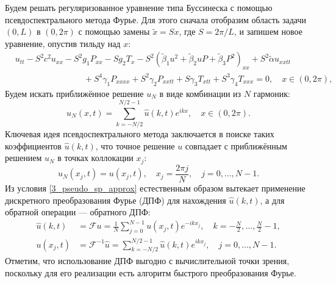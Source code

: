 \documentclass[12pt, a4paper]{report}
\begin{document}
Будем решать регуляризованное уравнение типа Буссинеска с помощью псевдоспектрального метода Фурье. Для этого сначала отобразим область задачи $(0, L)$ в $(0, 2\pi)$ с помощью замены $\tilde x = Sx$, где $S = 2\pi/L$, и запишем новое уравнение, опустив тильду над $x$:
\begin{equation}
\label{3_bq_reg_scaled}
\begin{split}
&u_{tt} - S^2 c^2 u_{xx} - S^2 g_1 P_{xx} - S g_2 T_x - S^2\left(\tilde{\beta}_1 u^2 + \tilde{\beta}_2 u P + \tilde{\beta}_3 P^2\right)_{xx} + S^2\tilde\alpha u_{xxtt}\\
&\qquad\qquad\qquad\qquad + S^4\gamma_1 P_{xxxx} + S^2\gamma_2 P_{xxtt} + S\gamma_3 T_{xtt} + S^3\gamma_4 T_{xxx} = 0, \quad x\in(0, 2\pi),
\end{split}
\end{equation}
Будем искать приближённое решение $u_N$ в виде комбинации из $N$ гармоник:
\begin{equation}\label{3_spect_approx}
u_N(x, t) = \sum_{k=-N/2}^{N/2-1} \widehat u(k, t) e^{ikx}, \quad x\in(0, 2\pi).
\end{equation}
Ключевая идея псевдоспектрального метода заключается в поиске таких коэффициентов $\widehat u(k, t)$, что точное решение $u$ совпадает с приближённым решением $u_N$ в точках коллокации $x_j$:
\begin{equation}\label{3_pseudo_sp_approx}
u_N(x_j, t) = u(x_j, t), \quad x_j = \frac{2\pi j}{N}, \quad j=0,\dots, N-1.
\end{equation}
Из условия \eqref{3_pseudo_sp_approx} естественным образом вытекает применение дискретного преобразования Фурье (ДПФ) для нахождения $\widehat u(k, t)$, а для обратной операции --- обратного ДПФ:
\begin{align}\label{3_dft}
\widehat u(k, t) &= \mathcal{F} u = \frac1N\sum_{j=0}^{N-1} u(x_j, t) e^{-ikx_j}, \quad k=-\frac N 2, \dots, \frac N 2 - 1,\\
\label{3_idft}
u(x_j, t) &= \mathcal{F}^{-1} \widehat u = \sum_{k=-N/2}^{N/2-1} \widehat u(k, t) e^{ikx_j}, \quad j=0, \dots, N-1.
\end{align}
Отметим, что использование ДПФ выгодно с вычислительной точки зрения, поскольку для его реализации есть алгоритм быстрого преобразования Фурье.
\end{document}
